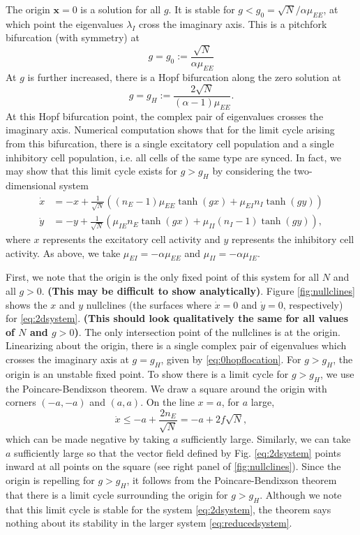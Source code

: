 \documentclass[11pt,reqno]{amsart}
\newcommand{\xvec}{\mathbf{x}}
\begin{document}
The origin $\xvec = 0$ is a solution for all $g$. It is stable for $g < g_0 = \sqrt{N}/\alpha \mu_{EE}$, at which point the eigenvalues $\lambda_I$ cross the imaginary axis. This is a pitchfork bifurcation (with symmetry) at
\begin{equation}\label{eq:pitchlocation}
    g = g_0 := \frac{\sqrt{N}}{\alpha \mu_{EE}}
\end{equation}
At $g$ is further increased, there is a Hopf bifurcation along the zero solution at
\begin{equation}\label{eq:0hopflocation}
    g= g_H := \frac{ 2\sqrt{N} }{ (\alpha-1)\mu_{EE} }.
\end{equation} 
At this Hopf bifurcation point, the complex pair of eigenvalues crosses the imaginary axis. Numerical computation shows that  for the limit cycle arising from this bifurcation, there is a single excitatory cell population and a single inhibitory cell population, i.e. all cells of the same type are synced. In fact, we may show that this limit cycle exists for $g > g_H$ by considering the two-dimensional system
\begin{equation}\label{eq:2dsystem}
\begin{aligned}
\dot{x} &= -x + \frac{1}{\sqrt{N}}\left((n_E - 1)\mu_{EE} \tanh(g x) + \mu_{EI} n_I \tanh(g y) \right) \\
\dot{y} &= -y + \frac{1}{\sqrt{N}}\left( \mu_{IE} n_E \tanh(g x) + \mu_{II} (n_I - 1) \tanh(g y) \right), 
\end{aligned}
\end{equation}
where $x$ represents the excitatory cell activity and $y$ represents the inhibitory cell activity. As above, we take $\mu_{EI} = -\alpha \mu_{EE}$ and $\mu_{II} = -\alpha \mu_{IE}$. 

First, we note that the origin is the only fixed point of this system for all $N$ and all $g > 0$. \textbf{(This may be difficult to show analytically)}.  Figure \ref{fig:nullclines} shows the $x$ and $y$ nullclines (the surfaces where $\dot{x} = 0$ and $\dot{y} = 0$, respectively) for \cref{eq:2dsystem}. \textbf{(This should look qualitatively the same for all values of $N$ and $g > 0$)}. 
The only intersection point of the nullclines is at the origin. Linearizing about the origin, there is a single complex pair of eigenvalues which crosses the imaginary axis at $g = g_H$, given by \cref{eq:0hopflocation}. For $g > g_H$, the origin is an unstable fixed point. To show there is a limit cycle for $g > g_H$, we use the Poincare-Bendixson theorem. We draw a square around the origin with corners $(-a, -a)$ and $(a, a)$. On the line $x = a$, for $a$ large, 
\[
\dot{x} \leq -a + \frac{2 n_E}{\sqrt{N}} = -a + 2 f \sqrt{N},
\]
which can be made negative by taking $a$ sufficiently large. Similarly, we can take $a$ sufficiently large so that the vector field defined by Fig. \ref{eq:2dsystem} points inward at all points on the square (see right panel of \cref{fig:nullclines}). Since the origin is repelling for $g > g_H$, it follows from the Poincare-Bendixson theorem that there is a limit cycle surrounding the origin for $g > g_H$. Although we note that this limit cycle is stable for the system \cref{eq:2dsystem}, the theorem says nothing about its stability in the larger system \cref{eq:reducedsystem}.
\end{document}

